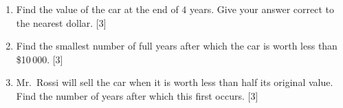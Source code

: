 \documentclass[12pt, twoside]{article}
\begin{document}
\begin{enumerate}[itemsep=0.4cm]
\begin{enumerate}[itemsep=0.4cm]
  \vspace{2.5cm}

  \item Find the value of the car at the end of $4$ years. Give your answer
  correct to the nearest dollar. \hfill [3]

  \vspace{4.5cm}

  \item Find the smallest number of full years after which the car is worth
  less than \$10\,000. \hfill [3]

  \vspace{4.5cm}

  \item Mr.\ Rossi will sell the car when it is worth less than half its
  original value. Find the number of years after which this first occurs.
  \hfill [3]

  \vspace{4cm}
\end{enumerate}

\end{enumerate}
\end{document}
